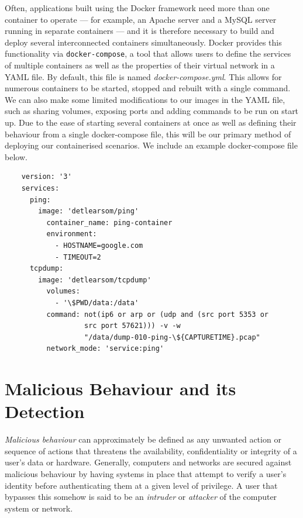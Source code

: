 \documentclass[msc,deptreport, cs]{infthesis} %
\begin{document}
   Often, applications built using the Docker framework need more than one container to operate --- for example, an Apache server and a MySQL server running in separate containers --- and it is therefore necessary to build and deploy several interconnected containers simultaneously. Docker provides this functionality via \texttt{docker-compose}, a tool that allows users to define the services of multiple containers as well as the properties of their virtual network in a YAML file. By default, this file is named \textit{docker-compose.yml}. This allows for numerous containers to be started, stopped and rebuilt with a single command. We can also make some limited modifications to our images in the YAML file, such as sharing volumes, exposing ports and adding commands to be run on start up. Due to the ease of starting several containers at once as well as defining their behaviour from a single docker-compose file, this will be our primary method of deploying our containerised scenarios. We include an example docker-compose file below.
   
   \vspace{10mm}

  \begin{verbatim}
    version: '3'
    services:
      ping: 
        image: 'detlearsom/ping'
          container_name: ping-container
          environment:
            - HOSTNAME=google.com
            - TIMEOUT=2
      tcpdump:
        image: 'detlearsom/tcpdump'
          volumes:
            - '\$PWD/data:/data'
          command: not(ip6 or arp or (udp and (src port 5353 or 
                   src port 57621))) -v -w 
                   "/data/dump-010-ping-\${CAPTURETIME}.pcap"
          network_mode: 'service:ping'
  \end{verbatim}


\section{Malicious Behaviour and its Detection}


\textit{Malicious behaviour} can approximately be defined as any unwanted action or sequence of actions that threatens the availability, confidentiality or integrity of a user's data or hardware. Generally, computers and networks are secured against malicious behaviour by having systems in place that attempt to verify a user's identity before authenticating them at a given level of privilege. A user that bypasses this somehow is said to be an \textit{intruder} or \textit{attacker} of the computer system or network.
\end{document}
